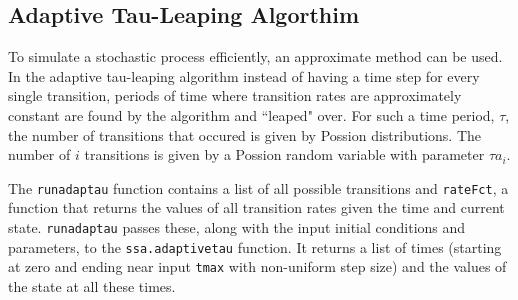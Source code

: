 \documentclass{article}\usepackage[]{graphicx}\usepackage[]{color}
\begin{document}
\subsection{Adaptive Tau-Leaping Algorthim} 
To simulate a stochastic process efficiently, an approximate method can be used. In the adaptive tau-leaping algorithm instead of having a time step for every single transition, periods of time where transition rates are approximately constant are found by the algorithm and ``leaped" over. For such a time period, $\tau$, the number of transitions that occured is given by Possion distributions. The number of $i$ transitions is given by a Possion random variable with parameter $\tau a_i$. 
\par
The \verb|runadaptau| function contains a list of all possible transitions and \verb|rateFct|, a function that returns the values of all transition rates given the time and current state. \verb|runadaptau| passes these, along with the input initial conditions and parameters, to the \verb|ssa.adaptivetau| function. It returns a list of times (starting at zero and ending near input \verb|tmax| with non-uniform step size) and the values of the state at all these times. 
\end{document}
